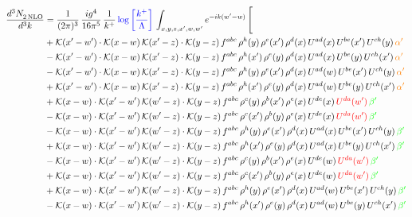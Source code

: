 \documentclass[9pt]{article}
\numberwithin{equation}{section}
\begin{document}
\begin{align}
  \frac{d^{3}N_{2\,\rm NLO}^{\rm}}{d^{3}k}  & = \frac{1}{(2\pi)^{3}}\, \frac{ig^{4}}{16\pi^{5}}\, \frac{1}{k^{+}}\, {\color{blue}\log{\left[\frac{k^{+}}{\Lambda}\right]}}\, \int_{x,y,z,x^{\prime},w,w^{\prime}}e^{-ik(w^{\prime}-w)}\, \Bigg[\notag \\ &   +\mathcal{K}(x'-w')\cdot\mathcal{K}(x-w)\,\mathcal{K}(x'-z)\cdot\mathcal{K}(y-z)\, f^{abc}\,\rho^{h}(y)\,\rho^{e}(x')\,\rho^{d}(x)\,U^{ad}(x)\,U^{be}(x')\,U^{ch}(y)\,{\color{orange}\alpha'}\notag\\ &-\mathcal{K}(x'-w')\cdot\mathcal{K}(x-w)\,\mathcal{K}(x'-z)\cdot\mathcal{K}(y-z)\, f^{abc}\,\rho^{h}(x')\,\rho^{e}(y)\,\rho^{d}(x)\,U^{ad}(x)\,U^{be}(y)\,U^{ch}(x')\,{\color{orange}\alpha'}\notag\\ &-\mathcal{K}(x'-w')\cdot\mathcal{K}(x-w)\,\mathcal{K}(x'-z)\cdot\mathcal{K}(y-z)\, f^{abc}\,\rho^{h}(y)\,\rho^{e}(x')\,\rho^{d}(x)\,U^{ad}(w)\,U^{be}(x')\,U^{ch}(y)\,{\color{orange}\alpha'}\notag \\ &+\mathcal{K}(x'-w')\cdot\mathcal{K}(x-w)\,\mathcal{K}(x'-z)\cdot\mathcal{K}(y-z)\, f^{abc}\,\rho^{h}(x')\,\rho^{e}(y)\,\rho^{d}(x)\,U^{ad}(w)\,U^{be}(y)\,U^{ch}(x')\,{\color{orange}\alpha'}\notag \\ & +\mathcal{K}(x-w)\cdot\mathcal{K}(x'-w')\,\mathcal{K}(w'-z)\cdot\mathcal{K}(y-z)\, f^{abc}\,\rho^{c}(y)\,\rho^{b}(x')\,\rho^{e}(x)\,U^{de}(x)\,{\color{red}U^{da}(w')}\,{\color{green}\beta'}\notag \\ &-\mathcal{K}(x-w)\cdot\mathcal{K}(x'-w')\,\mathcal{K}(w'-z)\cdot\mathcal{K}(y-z)\, f^{abc}\,\rho^{c}(x')\,\rho^{b}(y)\,\rho^{e}(x)\,U^{de}(x)\,{\color{red}U^{da}(w')}\,{\color{green}\beta'}\notag \\ & -\mathcal{K}(x-w)\cdot\mathcal{K}(x'-w')\,\mathcal{K}(w'-z)\cdot\mathcal{K}(y-z)\, f^{abc}\,\rho^{h}(y)\,\rho^{e}(x')\,\rho^{d}(x)\,U^{ad}(x)\,U^{be}(x')\,U^{ch}(y)\,{\color{green}\beta'}\notag\\ &+\mathcal{K}(x-w)\cdot\mathcal{K}(x'-w')\,\mathcal{K}(w'-z)\cdot\mathcal{K}(y-z)\, f^{abc}\,\rho^{h}(x')\,\rho^{e}(y)\,\rho^{d}(x)\,U^{ad}(x)\,U^{be}(y)\,U^{ch}(x')\,{\color{green}\beta'}\notag\\ &-\mathcal{K}(x-w)\cdot\mathcal{K}(x'-w')\,\mathcal{K}(w'-z)\cdot\mathcal{K}(y-z)\, f^{abc}\,\rho^{c}(y)\,\rho^{b}(x')\,\rho^{e}(x)\,U^{de}(w)\,{\color{red}U^{da}(w')}\,{\color{green}\beta'}\notag\\ &+\mathcal{K}(x-w)\cdot\mathcal{K}(x'-w')\,\mathcal{K}(w'-z)\cdot\mathcal{K}(y-z)\, f^{abc}\,\rho^{c}(x')\,\rho^{b}(y)\,\rho^{e}(x)\,U^{de}(w)\,{\color{red}U^{da}(w')}\,{\color{green}\beta'}\notag\\ &+\mathcal{K}(x-w)\cdot\mathcal{K}(x'-w')\,\mathcal{K}(w'-z)\cdot\mathcal{K}(y-z)\, f^{abc}\,\rho^{h}(y)\,\rho^{e}(x')\,\rho^{d}(x)\,U^{ad}(w)\,U^{be}(x')\,U^{ch}(y)\,{\color{green}\beta'}\notag \\ &-\mathcal{K}(x-w)\cdot\mathcal{K}(x'-w')\,\mathcal{K}(w'-z)\cdot\mathcal{K}(y-z)\, f^{abc}\,\rho^{h}(x')\,\rho^{e}(y)\,\rho^{d}(x)\,U^{ad}(w)\,U^{be}(y)\,U^{ch}(x')\,{\color{green}\beta'}
\end{align}  
\end{document}

